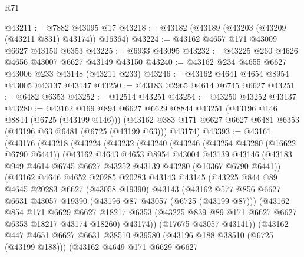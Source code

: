 \begin{lexlean}{R71}
\begin{coremodule}
@43211 := @7882 @43095 @17
@43218 := @43182 (@43189 (@43203 (@43209 (@43211 @831) @43174)) @16364)
@43224 := @43162 @4657 @171 @43009 @6627 @43150 @6353
@43225 := @6933 @43095
@43232 := @43225 @260 @4626 @4656 @43007 @6627 @43149 @43150
@43240 := @43162 @234 @4655 @6627 @43006 @233 @43148 (@43211 @233)
@43246 := @43162 @4641 @4654 @8954 @43005 @43137 @43147
@43250 := @43183 @2965 @4614 @6745 @6627
@43251 := @6482 @6353
@43252 := @12514 @43251
@43254 := @43250 @43252 @43137
@43280 := @43162
    @169
    @894
    @6627
    @6629
    @8844
    @43251
    (@43196 @146 @8844 (@6725 (@43199 @146)))
    (@43162 @383 @171 @6627 @6627 @6481 @6353 (@43196 @63 @6481 (@6725 (@43199 @63))) @43174)
@43393 := @43161
    (@43176
      (@43218
        (@43224
          (@43232
            (@43240
              (@43246
                (@43254 @43280 (@16622 @6790 @6441))
                (@43162
                  @4643
                  @4653
                  @8954
                  @43004
                  @43139
                  @43146
                  (@43183 @949 @4614 @6745 @6627 @43252 @43139 @43280 (@10367 @6790 @6441))
                  (@43162
                    @4646
                    @4652
                    @20285
                    @20283
                    @43143
                    @43145
                    (@43225
                      @844
                      @89
                      @4645
                      @20283
                      @6627
                      (@43058 @19390)
                      @43143
                      (@43162
                        @577
                        @856
                        @6627
                        @6631
                        @43057
                        @19390
                        (@43196 @87 @43057 (@6725 (@43199 @87)))
                        (@43162
                          @854
                          @171
                          @6629
                          @6627
                          @18217
                          @6353
                          (@43225 @839 @89 @171 @6627 @6627 @6353 @18217 @43174 @18260)
                          @43174))
                      (@17675 @43057 @43141))
                    (@43162
                      @447
                      @4651
                      @6627
                      @6631
                      @38510
                      @39580
                      (@43196 @188 @38510 (@6725 (@43199 @188)))
                      (@43162
                        @4649
                        @171
                        @6629
                        @6627

\end{coremodule}
\end{lexlean}
